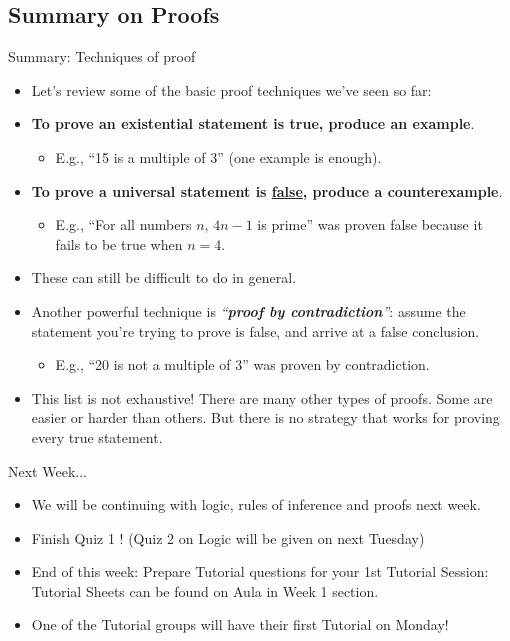 \documentclass[11pt,aspectratio=1610]{beamer}
\begin{document}
\subsection{Summary on Proofs}		
		\begin{frame}{Summary: Techniques of proof}
			\begin{itemize}\itemsep4mm
				\item Let's review some of the basic proof techniques we've seen so far: \p
				\item \textbf{To prove an existential statement is true, produce an example}. 
				\begin{itemize}
					\item E.g., ``15 is a multiple of 3'' (one example is enough).
				\end{itemize}\p
				\item \textbf{To prove a universal statement is \underline{false}, produce a counterexample}. 
				\begin{itemize}
					\item E.g., ``For all numbers $n$, $4n-1$ is prime'' was proven false because it fails to be true when $n=4$. 
				\end{itemize}\p
				\item These can still be difficult to do in general. \p
				\item Another powerful technique is \emph{``\textbf{proof by contradiction}''}: assume the statement you're trying to prove is false, and arrive at a false conclusion. 
				\begin{itemize}
					\item E.g., ``20 is not a multiple of 3'' was proven by contradiction. \p 
				\end{itemize}
				\item This list is not exhaustive! There are many other types of proofs. Some are easier or harder than others. But there is no strategy that works for proving every true statement. 
			\end{itemize}
		\end{frame}

\begin{frame}{Next Week...}
	
	\begin{itemize}\itemsep8mm
		\item We will be continuing with logic, rules of inference and proofs next week.
		\item Finish Quiz 1 ! (Quiz 2 on Logic will be given on next Tuesday)
		\item End of this week: Prepare Tutorial questions for your 1st Tutorial Session: Tutorial Sheets can be found on Aula in Week 1 section.
		\item One of the Tutorial groups will have their first Tutorial on Monday!
	\end{itemize}
	
	
	
\end{frame}


%
			
%	
	
		
\end{document}

